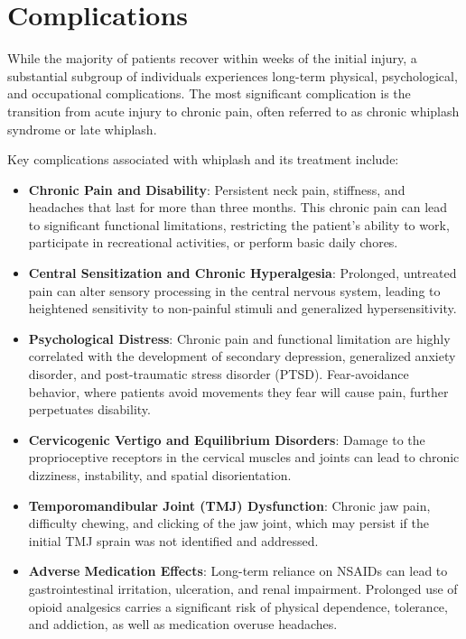 \section*{Complications}
While the majority of patients recover within weeks of the initial injury, a substantial subgroup of individuals experiences long-term physical, psychological, and occupational complications. The most significant complication is the transition from acute injury to chronic pain, often referred to as chronic whiplash syndrome or late whiplash.

Key complications associated with whiplash and its treatment include:
\begin{itemize}
    \item \textbf{Chronic Pain and Disability}: Persistent neck pain, stiffness, and headaches that last for more than three months. This chronic pain can lead to significant functional limitations, restricting the patient's ability to work, participate in recreational activities, or perform basic daily chores.
    \item \textbf{Central Sensitization and Chronic Hyperalgesia}: Prolonged, untreated pain can alter sensory processing in the central nervous system, leading to heightened sensitivity to non-painful stimuli and generalized hypersensitivity.
    \item \textbf{Psychological Distress}: Chronic pain and functional limitation are highly correlated with the development of secondary depression, generalized anxiety disorder, and post-traumatic stress disorder (PTSD). Fear-avoidance behavior, where patients avoid movements they fear will cause pain, further perpetuates disability.
    \item \textbf{Cervicogenic Vertigo and Equilibrium Disorders}: Damage to the proprioceptive receptors in the cervical muscles and joints can lead to chronic dizziness, instability, and spatial disorientation.
    \item \textbf{Temporomandibular Joint (TMJ) Dysfunction}: Chronic jaw pain, difficulty chewing, and clicking of the jaw joint, which may persist if the initial TMJ sprain was not identified and addressed.
    \item \textbf{Adverse Medication Effects}: Long-term reliance on NSAIDs can lead to gastrointestinal irritation, ulceration, and renal impairment. Prolonged use of opioid analgesics carries a significant risk of physical dependence, tolerance, and addiction, as well as medication overuse headaches.
\end{itemize}

